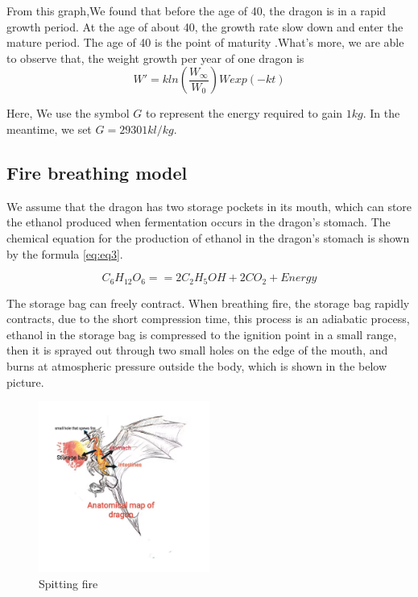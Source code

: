\documentclass[12pt]{article}  %
\newenvironment{shrinkeq}[1]
{ \bgroup
	\addtolength\abovedisplayshortskip{#1}
	\addtolength\abovedisplayskip{#1}
	\addtolength\belowdisplayshortskip{#1}
	\addtolength\belowdisplayskip{#1}}
{\egroup\ignorespacesafterend}
\begin{document}
	


From this graph,We found that before the age of 40, the dragon is in a rapid growth period. At the age of about 40, the growth rate slow down and enter the mature period. The age of 40 is the point of maturity
.What's more, we are able to observe that, the weight growth per year of one dragon is  
\begin{shrinkeq}{-1ex}
	\begin{equation}
    \label{eq:eq2}
	   W' = kln(\frac{W_\infty}{W_0})Wexp(-kt)
	\end{equation}
\end{shrinkeq}

Here, We use the symbol $G$ to represent the energy required to gain $1kg$. In the meantime, we set $G = 29301 kl/kg$.

\newpage
\subsection{Fire breathing model}
We assume that the dragon has two storage pockets in its mouth, which can store the ethanol produced when fermentation occurs in the dragon's stomach. The chemical equation for the production of ethanol in the dragon's stomach is shown by the formula \eqref{eq:eq3}.


\begin{shrinkeq}{-1ex}
	\begin{equation}
    \label{eq:eq3}
	   C_6H_{12}O_6 == 2C_2H_5OH + 2CO_2 + Energy
	\end{equation}
\end{shrinkeq}

The storage bag can freely contract. When breathing fire, the storage bag rapidly contracts, due to the short compression time, this process is an adiabatic process, ethanol in the storage bag is compressed to the ignition point in a small range, then it is sprayed out through two small holes on the edge of the mouth, and burns at atmospheric pressure outside the body, which is shown in the below picture.

\begin{figure}[h]
	\centering
	\includegraphics[width=0.5\textwidth]{easymcm/img/spitting fire picture(1).pdf}
	\caption{Spitting fire}\label{fig:spitting fire}
\end{figure}
\vspace{-0.3cm}
\end{document}
